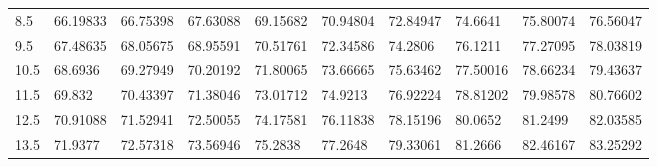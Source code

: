 \documentclass[10pt,twocolumn,letterpaper]{article}
\begin{document}
\begin{table}
{\begin{tabular}{llllllllll}
    8.5             & 66.19833                               & 66.75398                               & 67.63088                                & 69.15682                                & 70.94804                                & 72.84947                                & 74.6641                                 & 75.80074                                & 76.56047                                \\
    9.5             & 67.48635                               & 68.05675                               & 68.95591                                & 70.51761                                & 72.34586                                & 74.2806                                 & 76.1211                                 & 77.27095                                & 78.03819                                \\
    10.5            & 68.6936                                & 69.27949                               & 70.20192                                & 71.80065                                & 73.66665                                & 75.63462                                & 77.50016                                & 78.66234                                & 79.43637                                \\
    11.5            & 69.832                                 & 70.43397                               & 71.38046                                & 73.01712                                & 74.9213                                 & 76.92224                                & 78.81202                                & 79.98578                                & 80.76602                                \\
    12.5            & 70.91088                               & 71.52941                               & 72.50055                                & 74.17581                                & 76.11838                                & 78.15196                                & 80.0652                                 & 81.2499                                 & 82.03585                                \\
    13.5            & 71.9377                                & 72.57318                               & 73.56946                                & 75.2838                                 & 77.2648                                 & 79.33061                                & 81.2666                                 & 82.46167                                & 83.25292                                \\

\end{tabular}}
\end{table}
\end{document}

